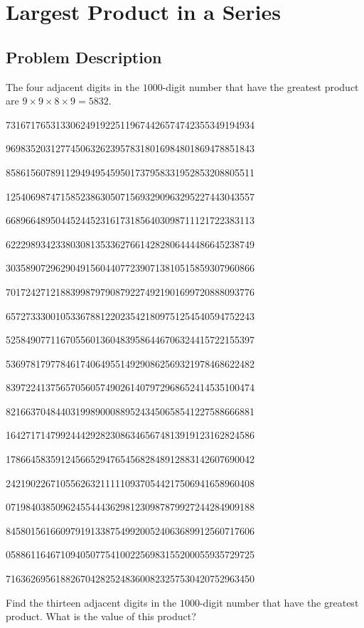 \chapter{Largest Product in a Series}
\section{Problem Description}
\begin{tcolorbox}
	The four adjacent digits in the $1000$-digit number that have the greatest product are $9 \times 9 \times 8 \times 9
	= 5832$.

	73167176531330624919225119674426574742355349194934

	96983520312774506326239578318016984801869478851843

	85861560789112949495459501737958331952853208805511

	12540698747158523863050715693290963295227443043557

	66896648950445244523161731856403098711121722383113

	62229893423380308135336276614282806444486645238749

	30358907296290491560440772390713810515859307960866

	70172427121883998797908792274921901699720888093776

	65727333001053367881220235421809751254540594752243

	52584907711670556013604839586446706324415722155397

	53697817977846174064955149290862569321978468622482

	83972241375657056057490261407972968652414535100474

	82166370484403199890008895243450658541227588666881

	16427171479924442928230863465674813919123162824586

	17866458359124566529476545682848912883142607690042

	24219022671055626321111109370544217506941658960408

	07198403850962455444362981230987879927244284909188

	84580156166097919133875499200524063689912560717606

	05886116467109405077541002256983155200055935729725

	71636269561882670428252483600823257530420752963450


	Find the thirteen adjacent digits in the $1000$-digit number that have the greatest product. What is the value of
	this product?
\end{tcolorbox}
